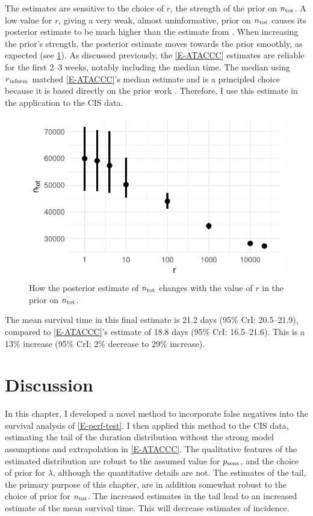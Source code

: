 \documentclass[thesis.tex]{subfiles}
\begin{document}
The estimates are sensitive to the choice of $r$, the strength of the prior on $\ntot$.
A low value for $r$, giving a very weak, almost uninformative, prior on $\ntot$ causes its posterior estimate to be much higher than the estimate from \textcite{birrellRTM2}.
When increasing the prior's strength, the posterior estimate moves towards the prior smoothly, as expected (see \cref{imperf-test:fig:ntot}).
As discussed previously, the \cref{E-ATACCC} estimates are reliable for the first 2--3 weeks, notably including the median time.
The median using $r{_{\text{inform}}}$ matched \cref{E-ATACCC}'s median estimate and is a principled choice because it is based directly on the prior work \textcite{birrellRTM2}.
Therefore, I use this estimate in the application to the CIS data.
\begin{figure}
  \centering \includegraphics{cis-imperfect-testing/CIS_ntot}
  \caption[Sensitivity of $\ntot$'s posterior to its prior.]{How the posterior estimate of $\ntot$ changes with the value of $r$ in the prior on $\ntot$.}
  \label{imperf-test:fig:ntot}
\end{figure}

The mean survival time in this final estimate is 21.2 days (95\% CrI: 20.5--21.9), compared to \cref{E-ATACCC}'s estimate of 18.8 days (95\% CrI: 16.5--21.6).
This is a 13\% increase (95\% CrI: 2\% decrease to 29\% increase).

\section{Discussion} \label{imperf-test:sec:discussion}

In this chapter, I developed a novel method to incorporate false negatives into the survival analysis of \cref{E-perf-test}.
I then applied this method to the CIS data, estimating the tail of the duration distribution without the strong model assumptions and extrapolation in \cref{E-ATACCC}.
The qualitative features of the estimated distribution are robust to the assumed value for $p_\text{sens}$, and the choice of prior for $\lambda$, although the quantitative details are not.
The estimates of the tail, the primary purpose of this chapter, are in addition somewhat robust to the choice of prior for $\ntot$.
The increased estimates in the tail lead to an increased estimate of the mean survival time.
This will decrease estimates of incidence.
\end{document}
